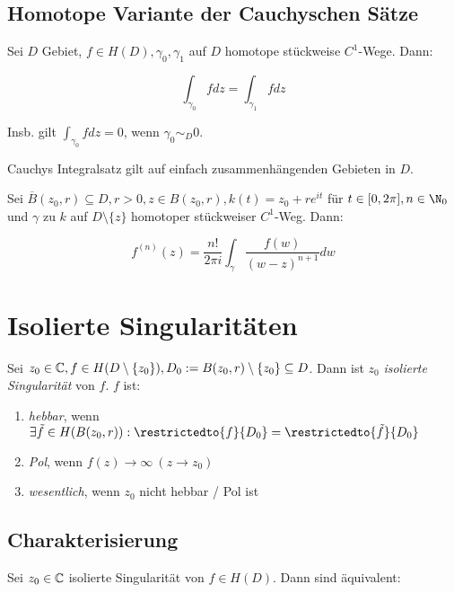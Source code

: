 \subsection*{Homotope Variante der Cauchyschen Sätze}

Sei $D$ Gebiet, $f \in H(D), \gamma_0, \gamma_1$ auf $D$ homotope stückweise $C^1$-Wege. Dann:

$$\int_{\gamma_0} f dz = \int_{\gamma_1} f dz$$

Insb. gilt $\int_{\gamma_0} f dz = 0$, wenn $\gamma_0 \sim_D 0$.

Cauchys Integralsatz gilt auf einfach zusammenhängenden Gebieten in $D$.

\spacing

Sei $\overline B(z_0,r) \subseteq D, r > 0, z \in B(z_0,r), k(t) = z_0 + re^{it}$ für $t \in [0, 2\pi], n \in \N_0$ und $\gamma$ zu $k$ auf $D \setminus \{z\}$ homotoper stückweiser $C^1$-Weg. Dann:

$$f^{(n)}(z) = \frac{n!}{2\pi i} \int_\gamma \frac{f(w)}{(w-z)^{n+1}} dw$$

\section*{Isolierte Singularitäten}

Sei $z_0 \in \mathbb{C}, f \in H(D \setminus \{z_0\}), D_0 := B(z_0,r) \setminus \{z_0\} \subseteq D$. Dann ist $z_0$ \emph{isolierte Singularität} von $f$. $f$ ist:

\begin{enumerate}[label=(\alph*)]
	\item \emph{hebbar}, wenn $\exists \tilde f \in H(B(z_0,r)) : \restrictedto{f}{D_0} = \restrictedto{\tilde f}{D_0}$
	\item \emph{Pol}, wenn $f(z) \to \infty \ (z \to z_0)$
	\item \emph{wesentlich}, wenn $z_0$ nicht hebbar / Pol ist
\end{enumerate}

\subsection*{Charakterisierung}

Sei $z_0 \in \mathbb{C}$ isolierte Singularität von $f \in H(D)$. Dann sind äquivalent:

